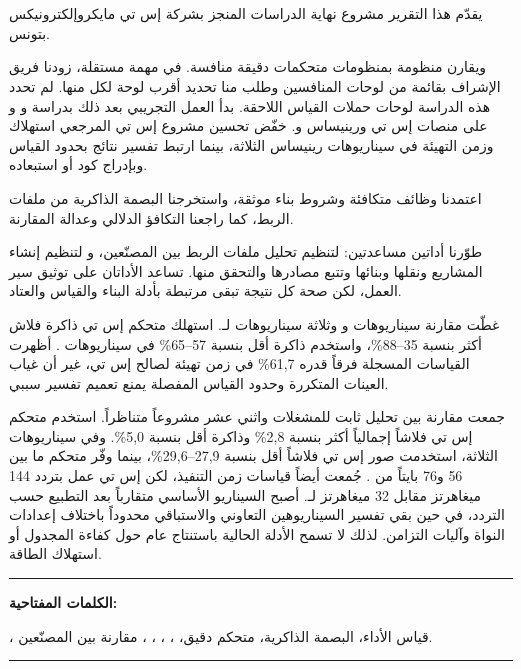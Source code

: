 \chapter*{}
{}

\setlength{\emergencystretch}{3em}
\begin{RLtext}

\noindent يقدّم هذا التقرير مشروع نهاية الدراسات المنجز بشركة إس تي مايكروإلكترونيكس بتونس.

ويقارن منظومة  بمنظومات متحكمات دقيقة منافسة. في مهمة مستقلة، زودنا فريق الإشراف بقائمة من لوحات المنافسين وطلب منا تحديد أقرب لوحة  لكل منها. لم تحدد هذه الدراسة لوحات حملات القياس اللاحقة. بدأ العمل التجريبي بعد ذلك بدراسة  و و على منصات إس تي ورينيساس و. خفّض تحسين مشروع إس تي المرجعي استهلاك  وزمن التهيئة في سيناريوهات رينيساس الثلاثة، بينما ارتبط تفسير نتائج  بحدود القياس وبإدراج كود  أو استبعاده.

اعتمدنا وظائف متكافئة وشروط بناء موثقة، واستخرجنا البصمة الذاكرية من ملفات الربط، كما راجعنا التكافؤ الدلالي وعدالة المقارنة.

طوّرنا أداتين مساعدتين:  لتنظيم تحليل ملفات الربط بين المصنّعين، و لتنظيم إنشاء المشاريع ونقلها وبنائها وتتبع مصادرها والتحقق منها. تساعد الأداتان على توثيق سير العمل، لكن صحة كل نتيجة تبقى مرتبطة بأدلة البناء والقياس والعتاد.

غطّت مقارنة  سيناريوهات  و وثلاثة سيناريوهات لـ. استهلك متحكم إس تي ذاكرة فلاش أكثر بنسبة 35--88\%، واستخدم ذاكرة  أقل بنسبة 57--65\% في سيناريوهات . أظهرت القياسات المسجلة فرقاً قدره 61,7\% في زمن تهيئة  لصالح إس تي، غير أن غياب العينات المتكررة وحدود القياس المفصلة يمنع تعميم تفسير سببي.

جمعت مقارنة  بين تحليل ثابت للمشغلات واثني عشر مشروعاً متناظراً. استخدم متحكم إس تي فلاشاً إجمالياً أكثر بنسبة 2,8\% وذاكرة  أقل بنسبة 5,0\%. وفي سيناريوهات  الثلاثة، استخدمت صور إس تي فلاشاً أقل بنسبة 27,9--29,6\%، بينما وفّر متحكم  ما بين 56 و76 بايتاً من . جُمعت أيضاً قياسات زمن التنفيذ، لكن إس تي عمل بتردد 144 ميغاهرتز مقابل 32 ميغاهرتز لـ. أصبح السيناريو الأساسي متقارباً بعد التطبيع حسب التردد، في حين بقي تفسير السيناريوهين التعاوني والاستباقي محدوداً باختلاف إعدادات النواة وآليات التزامن. لذلك لا تسمح الأدلة الحالية باستنتاج عام حول كفاءة المجدول أو استهلاك الطاقة.

\end{RLtext}

\noindent\rule[2pt]{\textwidth}{0.5pt}

\begin{RLtext}

{\textbf{الكلمات المفتاحية:}}

، قياس الأداء، البصمة الذاكرية، متحكم دقيق، ، ، ، ، مقارنة بين المصنّعين.
\\

\end{RLtext}

\noindent\rule[2pt]{\textwidth}{0.5pt}